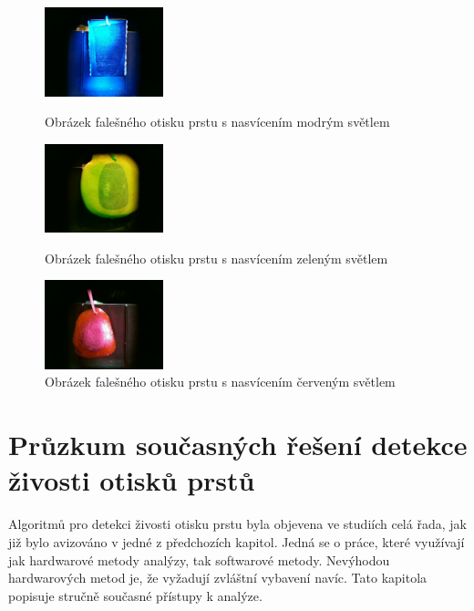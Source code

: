 \begin{figure}[!htbp]
  \begin{minipage}[b]{0.3\linewidth}
    \centering
    \includegraphics[width=130px]{obrazky-figures/fake23.jpg}
    \caption{Obrázek falešného otisku prstu s nasvícením modrým světlem}
  \end{minipage}
  \hspace{0.3cm}
  \begin{minipage}[b]{0.3\linewidth}
    \centering
    \includegraphics[width=130px]{obrazky-figures/fake64.jpg}
    \caption{Obrázek falešného otisku prstu s nasvícením zeleným světlem}
  \end{minipage}
  \hspace{0.3cm}
    \begin{minipage}[b]{0.3\linewidth}
    \centering
    \includegraphics[width=130px]{obrazky-figures/fake47.jpg}
    \caption{Obrázek falešného otisku prstu s nasvícením červeným světlem}
  \end{minipage}
\end{figure}

\chapter{Průzkum současných řešení detekce živosti otisků prstů}
\label{chap:Pruzkum}
Algoritmů pro detekci živosti otisku prstu byla objevena ve studiích celá řada, jak již bylo avizováno v jedné z předchozích kapitol. Jedná se o práce, které využívají jak hardwarové metody analýzy, tak softwarové metody. Nevýhodou hardwarových metod je, že vyžadují zvláštní vybavení navíc. Tato kapitola popisuje stručně současné přístupy k analýze.

